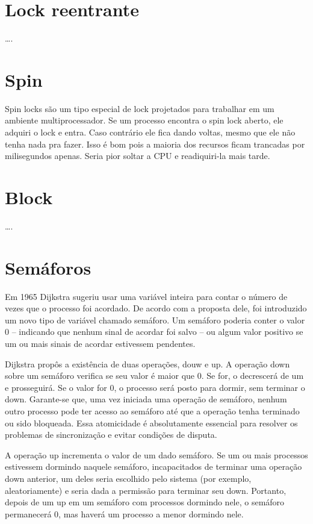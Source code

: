 \section{Lock reentrante}
….

\section{Spin}

Spin locks são um tipo especial de lock projetados para trabalhar em um ambiente 
multiprocessador. Se um processo encontra o spin lock aberto, ele adquiri o lock e entra. 
Caso contrário ele fica dando voltas, mesmo que ele não tenha nada pra fazer. Isso é bom 
pois a maioria dos recursos ficam trancadas por milisegundos apenas. Seria pior soltar a 
CPU e readiquiri-la mais tarde.

\section{Block}
….


\section{Semáforos}

Em 1965 Dijkstra sugeriu usar uma variável inteira para contar o número de vezes que o 
processo foi acordado. De acordo com a proposta dele, foi introduzido um novo tipo de 
variável chamado semáforo. Um semáforo poderia conter o valor 0 – indicando que nenhum 
sinal de acordar foi salvo – ou algum valor positivo se um ou mais sinais de acordar 
estivessem pendentes.

Dijkstra propôs a existência de duas operações,  douw e up. A operação down sobre um 
semáforo verifica se seu valor é maior que 0. Se for, o decrescerá de um e prosseguirá. 
Se o valor for 0, o processo será posto para dormir, sem terminar o down. Garante-se que, 
uma vez iniciada uma operação de semáforo, nenhum outro processo pode ter acesso ao 
semáforo até que a operação tenha terminado ou sido bloqueada. Essa atomicidade é 
absolutamente essencial para resolver os problemas de sincronização e evitar condições 
de disputa.

A operação up incrementa o valor de um dado semáforo. Se um ou mais processos estivessem 
dormindo naquele semáforo, incapacitados de terminar uma operação down anterior, um deles 
seria escolhido pelo sistema (por exemplo, aleatoriamente) e seria dada a permissão para 
terminar seu down. Portanto, depois de um up em um semáforo com processos dormindo nele, 
o semáforo permanecerá 0, mas haverá um processo a menor dormindo nele.

